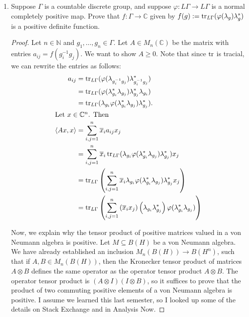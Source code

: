 \documentclass[a4paper,10pt]{report}
\newcommand{\ggen}[1]{\langle#1\rangle}
\newcommand{\ol}[1]{\overline{#1}}
\newcommand{\N}{\mathbb{N}}
\newcommand{\C}{\mathbb{C}}
\newcommand{\tens}{\otimes}
\begin{document}
\begin{enumerate}
\begin{enumerate}
		\end{enumerate}
	\item	Suppose $\Gamma$ is a countable discrete group,
		and suppose $\varphi : L\Gamma \to L\Gamma$ is a normal completely positive map.
		Prove that $f : \Gamma \to \C$ given by $f(g) := \operatorname{tr}_{L\Gamma}(\varphi(\lambda_g)\lambda_g^*)$
		is a positive definite function.
		\begin{proof}
			Let $n \in \N$ and $g_1, \dots, g_n \in \Gamma$.
			Let $A \in M_n(\C)$ be the matrix with entries $a_{ij} = f(g_i^{-1}g_j)$.
			We want to show $A \ge 0$.
			Note that since $\operatorname{tr}$ is tracial, we can rewrite the entries as follows:
			\begin{align*}
				a_{ij} & = \tr_{L\Gamma}(\varphi(\lambda_{g_i^{-1}g_j})\lambda_{g_i^{-1}g_j}^*) \\
				 & = \tr_{L\Gamma}(\varphi(\lambda_{g_i}^* \lambda_{g_j})
				 \lambda_{g_j}^*\lambda_{g_i}) \\
				 & = \tr_{L\Gamma}(\lambda_{g_i}\varphi(\lambda_{g_i}^* \lambda_{g_j})
				 \lambda_{g_j}^*). \\
			\intertext{Let $x \in \C^n$. Then}
				\ggen{Ax, x} & = \sum_{i,j=1}^n{\ol{x}_i a_{ij} x_j} \\
				 & = \sum_{i,j=1}^n{\ol{x}_i \tr_{L\Gamma}(\lambda_{g_i}
				 \varphi(\lambda_{g_i}^* \lambda_{g_j})\lambda_{g_j}^*) x_j} \\
				 & = \tr_{L\Gamma}\left( \sum_{i,j=1}^n{\ol{x}_i \lambda_{g_i}
				 \varphi(\lambda_{g_i}^* \lambda_{g_j})\lambda_{g_j}^* x_j} \right) \\
				 & = \tr_{L\Gamma}\left( \sum_{i,j=1}^n{
				 \left( \ol{x}_i x_j \right)
				\left( \lambda_{g_i} \lambda_{g_j}^* \right)
				\varphi(\lambda_{g_i}^* \lambda_{g_j})} \right)
			\end{align*}
			
			Now, we explain why the tensor product of positive matrices valued in a von Neumann algebra is positive. Let $M\subseteq B(H)$ be a von Neumann algebra. We have already established an inclusion $M_n(B(H))\to B(H^n)$, such that if $A,B\in M_n(B(H))$, then the Kronecker tensor product of matrices $A\tens B$ defines the same operator as the operator tensor product $A\tens B$. The operator tensor product is $(A\tens I)(I\tens B)$, so it suffices to prove that the product of two commuting positive elements of a von Neumann algebra is positive. I assume we learned this last semester, so I looked up some of the details on Stack Exchange and in Analysis Now. 
		

\end{proof}
\end{enumerate}
\end{document}

